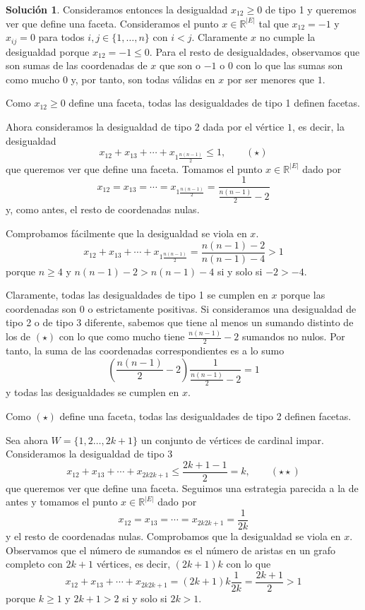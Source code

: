 \documentclass[10pt]{article}
\theoremstyle{definition}
\newtheorem*{sol}{Solución}
\begin{document}
\begin{sol}
Consideramos entonces la desigualdad $x_{12}\geq 0$ de tipo 1 y queremos ver que define una faceta. Consideramos el punto $x\in\mathbb{R}^{|E|}$ tal que $x_{12}=-1$ y $x_{ij}=0$ para todos $i,j\in\{1,\ldots, n\}$ con $i<j$. Claramente $x$ no cumple la desigualdad porque $x_{12}=-1\leq 0$. Para el resto de desigualdades, observamos que son sumas de las coordenadas de $x$ que son o $-1$ o $0$ con lo que las sumas son como mucho $0$ y, por tanto, son todas válidas en $x$ por ser menores que $1$.

Como $x_{12}\geq 0$ define una faceta, todas las desigualdades de tipo 1 definen facetas.

Ahora consideramos la desigualdad de tipo 2 dada por el vértice $1$, es decir, la desigualdad
$$x_{12}+x_{13}+\cdots+x_{1\frac{n(n-1)}{2}}\leq 1, \qquad(\star)$$
que queremos ver que define una faceta. Tomamos el punto $x\in\mathbb{R}^{|E|}$ dado por $$x_{12} = x_{13} = \cdots = x_{1\frac{n(n-1)}{2}}=\frac{1}{\frac{n(n-1)}{2}-2}$$ y, como antes, el resto de coordenadas nulas.

Comprobamos fácilmente que la desigualdad se viola en $x$.
$$x_{12}+x_{13}+\cdots+x_{1\frac{n(n-1)}{2}} =\frac{n(n-1)-2}{n(n-1)-4}>1$$
porque $n\geq 4$ y $n(n-1)-2>n(n-1)-4$ si y solo si $-2>-4$.

Claramente, todas las desigualdades de tipo 1 se cumplen en $x$ porque las coordenadas son $0$ o estrictamente positivas.
Si consideramos una desigualdad de tipo 2 o de tipo 3 diferente, sabemos que tiene al menos un sumando distinto de los de $(\star)$ con lo que como mucho tiene $\frac{n(n-1)}{2}-2$ sumandos no nulos. Por tanto, la suma de las coordenadas correspondientes es a lo sumo 
$$\left(\frac{n(n-1)}{2}-2\right)\frac{1}{\frac{n(n-1)}{2}-2} = 1$$
y todas las desigualdades se cumplen en $x$.

Como $(\star)$ define una faceta, todas las desigualdades de tipo 2 definen facetas.
 
Sea ahora $W=\{1,2\ldots, 2k+1\}$ un conjunto de vértices de cardinal impar. Consideramos la desigualdad de tipo 3
$$x_{12}+x_{13}+\cdots +x_{2k 2k+1}\leq \frac{2k+1-1}{2}=k,\qquad(\star\star)$$
que queremos ver que define una faceta. Seguimos una estrategia parecida a la de antes y tomamos el punto $x\in\mathbb{R}^{|E|}$ dado por 
$$x_{12}=x_{13}=\cdots = x_{2k2k+1}=\frac{1}{2k}$$
y el resto de coordenadas nulas. Comprobamos que la desigualdad se viola en $x$. Observamos que el número de sumandos es el número de aristas en un grafo completo con $2k+1$ vértices, es decir, $(2k+1)k$ con lo que
$$x_{12}+x_{13}+\cdots+x_{2k2k+1}=(2k+1)k\frac{1}{2k}=\frac{2k+1}{2}>1$$
porque $k\geq 1$ y $2k+1>2$ si y solo si $2k>1$.


\end{sol}
\end{document}
